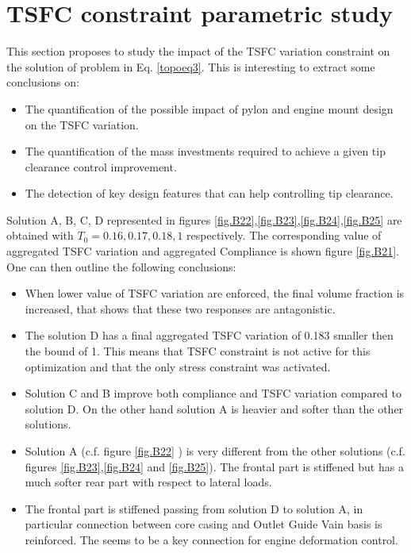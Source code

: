 \section{TSFC constraint parametric study}
\label{TSFCpareto}
This section proposes to study the impact of the TSFC variation constraint on the solution of problem in Eq. \ref{topoeq3}. This is interesting to extract some conclusions on:
\begin{itemize}
\item The quantification of the possible impact of pylon and engine mount design on the TSFC variation.
\item The quantification of the mass investments required to achieve a given tip clearance control improvement.
\item The detection of key design features that can help controlling tip clearance.
\end{itemize} 
Solution A, B, C, D represented in figures \ref{fig.B22},\ref{fig.B23},\ref{fig.B24},\ref{fig.B25} are obtained with $T_0=0.16,0.17,0.18,1$ respectively. The corresponding value of aggregated TSFC variation and aggregated Compliance is shown figure \ref{fig.B21}. 
One can then outline the following conclusions:
\begin{itemize}
\item When lower value of TSFC variation are enforced, the final volume fraction is increased, that shows that these two responses are antagonistic.
\item The solution D has a final aggregated TSFC variation of 0.183 smaller then the bound of 1. This means that TSFC constraint is not active for this optimization and that the only stress constraint was activated.
\item Solution C and B improve both compliance and TSFC variation compared to solution D. On the other hand solution A is heavier and softer than the other solutions.
\item Solution A (c.f. figure \ref{fig.B22} ) is very different from the other solutions (c.f. figures \ref{fig.B23},\ref{fig.B24} and \ref{fig.B25}). The frontal part is stiffened but has a much softer rear part with respect to lateral loads. 
\item The frontal part is stiffened passing from solution D to solution A, in particular connection between core casing and Outlet Guide Vain basis is reinforced. The seems to be a key connection for engine deformation control.
\end{itemize} 
